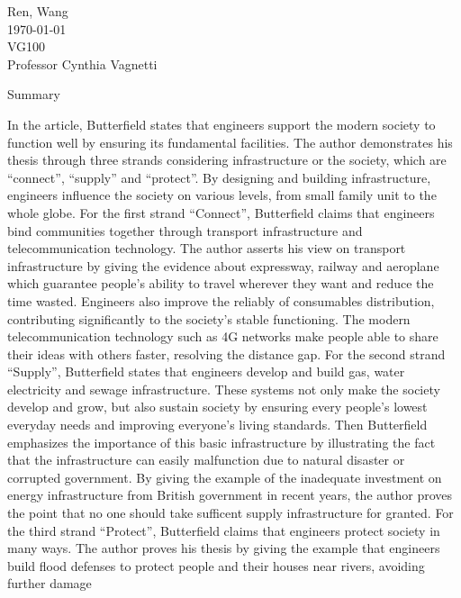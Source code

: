 \documentclass[12pt,a4]{article}
\begin{document}
\begin{flushleft}
Ren, Wang\\
\today\\
VG100\\
Professor Cynthia Vagnetti \\
\end{flushleft}

\begin{center}
Summary
\end{center}


In the article, Butterfield \cite{but} states that engineers support the modern
society to function well by ensuring its fundamental facilities. 
The author demonstrates his thesis through three strands considering
infrastructure or the society, which are ``connect'', ``supply'' and
``protect''. 
By designing and building infrastructure, engineers influence the society on
various levels, from small family unit to the whole globe.  
%
%
For the first strand ``Connect'', Butterfield claims that engineers bind
communities together through transport infrastructure and telecommunication
technology.
The author asserts his view on transport infrastructure by giving the evidence
about expressway, railway and aeroplane which guarantee people's ability to
travel wherever they want and reduce the time wasted. 
Engineers also improve the reliably of consumables distribution, contributing
significantly to the society's stable functioning. 
The modern telecommunication technology such as 4G networks make people able to
share their ideas with others faster, resolving the distance gap. 
%
%
For the second strand ``Supply'', Butterfield states that engineers develop and
build gas, water electricity and sewage infrastructure.
These systems not only make the society develop and grow, but also sustain
society by ensuring every people's lowest everyday needs and improving
everyone's living standards. 
Then Butterfield emphasizes the importance of this basic infrastructure by
illustrating the fact that the infrastructure can easily malfunction due to
natural disaster or corrupted government.
By giving the example of the inadequate investment on energy infrastructure from
British government in recent years, the author proves the point that no one
should take sufficent supply infrastructure for granted. 
%
%
For the third strand ``Protect'', Butterfield claims that engineers protect
society in many ways.
The author proves his thesis by giving the example that engineers build flood
defenses to protect people and their houses near rivers, avoiding further damage
\end{document}
